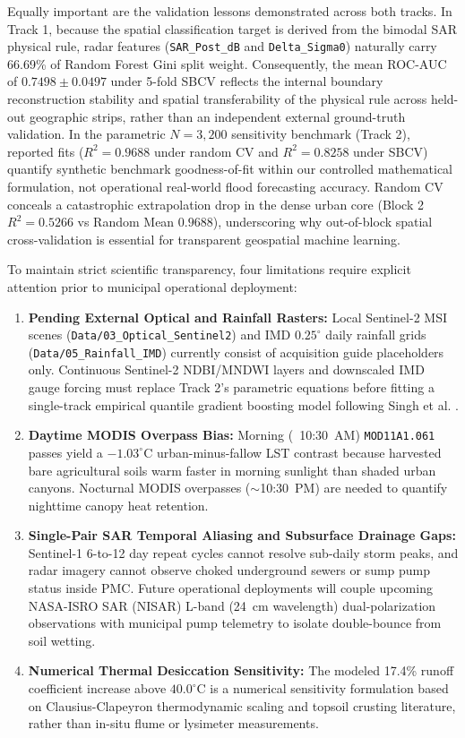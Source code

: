\documentclass[OA,linenum]{InterPore}
\begin{document}
Equally important are the validation lessons demonstrated across both tracks. In Track 1, because the spatial classification target is derived from the bimodal SAR physical rule, radar features (\texttt{SAR\_Post\_dB} and \texttt{Delta\_Sigma0}) naturally carry 66.69\% of Random Forest Gini split weight. Consequently, the mean ROC-AUC of $0.7498 \pm 0.0497$ under 5-fold SBCV reflects the internal boundary reconstruction stability and spatial transferability of the physical rule across held-out geographic strips, rather than an independent external ground-truth validation. In the parametric $N = 3,200$ sensitivity benchmark (Track 2), reported fits ($R^2 = 0.9688$ under random CV and $R^2 = 0.8258$ under SBCV) quantify synthetic benchmark goodness-of-fit within our controlled mathematical formulation, not operational real-world flood forecasting accuracy. Random CV conceals a catastrophic extrapolation drop in the dense urban core (Block 2 $R^2 = 0.5266$ vs Random Mean $0.9688$), underscoring why out-of-block spatial cross-validation is essential for transparent geospatial machine learning.

To maintain strict scientific transparency, four limitations require explicit attention prior to municipal operational deployment:
\begin{enumerate}
    \item \textbf{Pending External Optical and Rainfall Rasters:} Local Sentinel-2 MSI scenes (\texttt{Data/03\_Optical\_Sentinel2}) and IMD $0.25^\circ$ daily rainfall grids (\texttt{Data/05\_Rainfall\_IMD}) currently consist of acquisition guide placeholders only. Continuous Sentinel-2 NDBI/MNDWI layers and downscaled IMD gauge forcing must replace Track 2's parametric equations before fitting a single-track empirical quantile gradient boosting model following Singh et al. \cite{Singh2026}.
    \item \textbf{Daytime MODIS Overpass Bias:} Morning (~10:30~AM) \texttt{MOD11A1.061} passes yield a $-1.03^\circ\text{C}$ urban-minus-fallow LST contrast because harvested bare agricultural soils warm faster in morning sunlight than shaded urban canyons. Nocturnal MODIS overpasses ($\sim$10:30~PM) are needed to quantify nighttime canopy heat retention.
    \item \textbf{Single-Pair SAR Temporal Aliasing and Subsurface Drainage Gaps:} Sentinel-1 6-to-12 day repeat cycles cannot resolve sub-daily storm peaks, and radar imagery cannot observe choked underground sewers or sump pump status inside PMC. Future operational deployments will couple upcoming NASA-ISRO SAR (NISAR) L-band (24~cm wavelength) dual-polarization observations with municipal pump telemetry to isolate double-bounce from soil wetting.
    \item \textbf{Numerical Thermal Desiccation Sensitivity:} The modeled 17.4\% runoff coefficient increase above $40.0^\circ\text{C}$ is a numerical sensitivity formulation based on Clausius-Clapeyron thermodynamic scaling and topsoil crusting literature, rather than in-situ flume or lysimeter measurements.
\end{enumerate}
\end{document}
